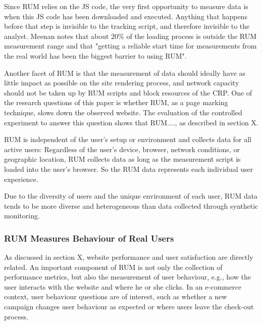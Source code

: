 Since RUM relies on the JS code, the very first opportunity to measure data is when this JS code has been downloaded and executed.
Anything that happens before that step is invisible to the tracking script, and therefore invisible to the analyst.
Meenan notes that about 20\% of the loading process is outside the RUM measurement range and that "getting a reliable start time for measurements from the real world has been the biggest barrier to using RUM". %

Another facet of RUM is that the measurement of data should ideally have as little impact as possible on the site rendering process, and network capacity should not be taken up by RUM scripts and block resources of the CRP. %
One of the research questions of this paper is whether RUM, as a page marking technique, slows down the observed website.
The evaluation of the controlled experiment to answer this question shows that RUM...., as described in section X. %


RUM is independent of the user's setup or environment and collects data for all active users:
Regardless of the user's device, browser, network conditions, or geographic location, RUM collects data as long as the measurement script is loaded into the user's browser. %
So the RUM data represents each individual user experience. %

Due to the diversity of users and the unique environment of each user, RUM data tends to be more diverse and heterogeneous than data collected through synthetic monitoring. %


\subsubsection{RUM Measures Behaviour of Real Users} %


As discussed in section X, website performance and user satisfaction are directly related.
An important component of RUM is not only the collection of performance metrics, but also the measurement of user behaviour, e.g., how the user interacts with the website and where he or she clicks. %
In an e-commerce context, user behaviour questions are of interest, such as whether a new campaign changes user behaviour as expected or where users leave the check-out process. %


